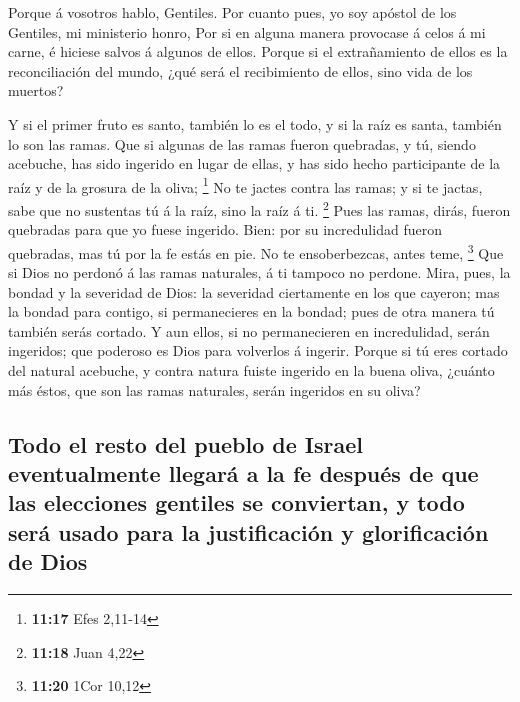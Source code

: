  Porque á vosotros hablo, Gentiles. Por cuanto pues, yo soy
apóstol de los Gentiles, mi ministerio honro,  Por si en
alguna manera provocase á celos á mi carne, é hiciese salvos á algunos
de ellos.  Porque si el extrañamiento de ellos es la
reconciliación del mundo, ¿qué será el recibimiento de ellos, sino vida
de los muertos?

 Y si el primer fruto es santo, también lo es el todo, y si
la raíz es santa, también lo son las ramas.  Que si algunas
de las ramas fueron quebradas, y tú, siendo acebuche, has sido ingerido
en lugar de ellas, y has sido hecho participante de la raíz y de la
grosura de la oliva; \footnote{\textbf{11:17} Efes 2,11-14}
 No te jactes contra las ramas; y si te jactas, sabe que no
sustentas tú á la raíz, sino la raíz á ti. \footnote{\textbf{11:18} Juan
  4,22}  Pues las ramas, dirás, fueron quebradas para que
yo fuese ingerido.  Bien: por su incredulidad fueron
quebradas, mas tú por la fe estás en pie. No te ensoberbezcas, antes
teme, \footnote{\textbf{11:20} 1Cor 10,12}  Que si Dios no
perdonó á las ramas naturales, á ti tampoco no perdone. 
Mira, pues, la bondad y la severidad de Dios: la severidad ciertamente
en los que cayeron; mas la bondad para contigo, si permanecieres en la
bondad; pues de otra manera tú también serás cortado.  Y
aun ellos, si no permanecieren en incredulidad, serán ingeridos; que
poderoso es Dios para volverlos á ingerir.  Porque si tú
eres cortado del natural acebuche, y contra natura fuiste ingerido en la
buena oliva, ¿cuánto más éstos, que son las ramas naturales, serán
ingeridos en su oliva?

\hypertarget{todo-el-resto-del-pueblo-de-israel-eventualmente-llegaruxe1-a-la-fe-despuuxe9s-de-que-las-elecciones-gentiles-se-conviertan-y-todo-seruxe1-usado-para-la-justificaciuxf3n-y-glorificaciuxf3n-de-dios}{%
\subsection{Todo el resto del pueblo de Israel eventualmente llegará a
la fe después de que las elecciones gentiles se conviertan, y todo será
usado para la justificación y glorificación de
Dios}\label{todo-el-resto-del-pueblo-de-israel-eventualmente-llegaruxe1-a-la-fe-despuuxe9s-de-que-las-elecciones-gentiles-se-conviertan-y-todo-seruxe1-usado-para-la-justificaciuxf3n-y-glorificaciuxf3n-de-dios}}

